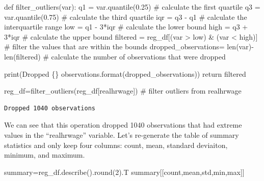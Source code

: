 \documentclass[
  letterpaper,
  DIV=11,
  numbers=noendperiod]{scrreprt}
\newenvironment{Shaded}{\begin{snugshade}}{\end{snugshade}}
\newcommand{\BuiltInTok}[1]{\textcolor[rgb]{0.00,0.23,0.31}{#1}}
\newcommand{\CommentTok}[1]{\textcolor[rgb]{0.37,0.37,0.37}{#1}}
\newcommand{\ControlFlowTok}[1]{\textcolor[rgb]{0.00,0.23,0.31}{#1}}
\newcommand{\DecValTok}[1]{\textcolor[rgb]{0.68,0.00,0.00}{#1}}
\newcommand{\FloatTok}[1]{\textcolor[rgb]{0.68,0.00,0.00}{#1}}
\newcommand{\KeywordTok}[1]{\textcolor[rgb]{0.00,0.23,0.31}{#1}}
\newcommand{\NormalTok}[1]{\textcolor[rgb]{0.00,0.23,0.31}{#1}}
\newcommand{\OperatorTok}[1]{\textcolor[rgb]{0.37,0.37,0.37}{#1}}
\newcommand{\SpecialCharTok}[1]{\textcolor[rgb]{0.37,0.37,0.37}{#1}}
\newcommand{\StringTok}[1]{\textcolor[rgb]{0.13,0.47,0.30}{#1}}
\begin{document}
\begin{Shaded}
\begin{Highlighting}[]
\KeywordTok{def}\NormalTok{ filter\_outliers(var):}
\NormalTok{    q1 }\OperatorTok{=}\NormalTok{ var.quantile(}\FloatTok{0.25}\NormalTok{) }\CommentTok{\# calculate the first quartile}
\NormalTok{    q3 }\OperatorTok{=}\NormalTok{ var.quantile(}\FloatTok{0.75}\NormalTok{) }\CommentTok{\# calculate the third quartile}
\NormalTok{    iqr }\OperatorTok{=}\NormalTok{ q3 }\OperatorTok{{-}}\NormalTok{ q1 }\CommentTok{\# calculate the interquartile range}
\NormalTok{    low }\OperatorTok{=}\NormalTok{ q1 }\OperatorTok{{-}} \DecValTok{3}\OperatorTok{*}\NormalTok{iqr }\CommentTok{\# calculate the lower bound}
\NormalTok{    high }\OperatorTok{=}\NormalTok{ q3 }\OperatorTok{+} \DecValTok{3}\OperatorTok{*}\NormalTok{iqr }\CommentTok{\# calculate the upper bound}
\NormalTok{    filtered }\OperatorTok{=}\NormalTok{ reg\_df[(var }\OperatorTok{\textgreater{}}\NormalTok{ low) }\OperatorTok{\&}\NormalTok{ (var }\OperatorTok{\textless{}}\NormalTok{ high)] }\CommentTok{\# filter  the values that are within the bounds}
\NormalTok{    dropped\_observations}\OperatorTok{=} \BuiltInTok{len}\NormalTok{(var)}\OperatorTok{{-}}\BuiltInTok{len}\NormalTok{(filtered) }\CommentTok{\# calculate the number of observations that were dropped}

    \BuiltInTok{print}\NormalTok{(}\StringTok{\textquotesingle{}Dropped }\SpecialCharTok{\{\}}\StringTok{ observations\textquotesingle{}}\NormalTok{.}\BuiltInTok{format}\NormalTok{(dropped\_observations))}
    \ControlFlowTok{return}\NormalTok{  filtered}

\NormalTok{reg\_df}\OperatorTok{=}\NormalTok{filter\_outliers(reg\_df[}\StringTok{\textquotesingle{}realhrwage\textquotesingle{}}\NormalTok{]) }\CommentTok{\# filter outliers from realhrwage}
\end{Highlighting}
\end{Shaded}

\begin{verbatim}
Dropped 1040 observations
\end{verbatim}

We can see that this operation dropped 1040 observations that had
extreme values in the ``realhrwage'' variable. Let's re-generate the
table of summary statistics and only keep four columns: count, mean,
standard deviaiton, minimum, and maximum.

\begin{Shaded}
\begin{Highlighting}[]
\NormalTok{summary}\OperatorTok{=}\NormalTok{reg\_df.describe().}\BuiltInTok{round}\NormalTok{(}\DecValTok{2}\NormalTok{).T}
\NormalTok{summary[[}\StringTok{\textquotesingle{}count\textquotesingle{}}\NormalTok{,}\StringTok{\textquotesingle{}mean\textquotesingle{}}\NormalTok{,}\StringTok{\textquotesingle{}std\textquotesingle{}}\NormalTok{,}\StringTok{\textquotesingle{}min\textquotesingle{}}\NormalTok{,}\StringTok{\textquotesingle{}max\textquotesingle{}}\NormalTok{]]}
\end{Highlighting}
\end{Shaded}
\end{document}

